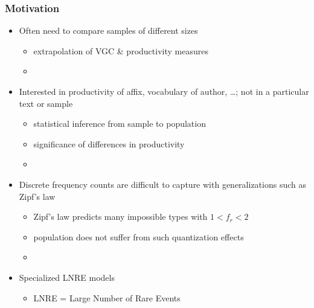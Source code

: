 \documentclass[t]{beamer} %
\begin{document}
\begin{frame}
  \frametitle{Motivation}

  \begin{itemize}
  \item Often need to compare samples of different sizes
    \begin{itemize}
    \item[\hand] extrapolation of VGC \& productivity measures
    \item[]
    \end{itemize}
  \item<2-> Interested in productivity of affix, vocabulary of author, \ldots; not in a particular text or sample\\
    \begin{itemize}
    \item[\hand] statistical inference from sample to population
    \item[\hand] significance of differences in productivity
    \item[]
    \end{itemize}
  \item<3-> Discrete frequency counts are difficult to capture with generalizations such as Zipf's law
    \begin{itemize}
    \item[\hand] Zipf's law predicts many impossible types with $1 < f_r < 2$
    \item[\hand] population does not suffer from such quantization effects
    \item[]
    \end{itemize}
  \item[\So] Specialized LNRE models \citep{Baayen:01}
    \begin{itemize}
    \item LNRE = Large Number of Rare Events
    \end{itemize}
  \end{itemize}
\end{frame}
\end{document}
